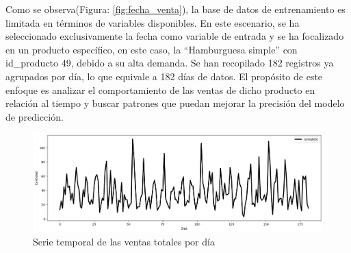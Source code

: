 Como se observa(Figura: \ref{fig:fecha_venta}), la base de datos de entrenamiento es limitada en términos de variables disponibles. En este escenario, se ha seleccionado exclusivamente la fecha como variable de entrada y se ha focalizado en un producto específico, en este caso, la “Hamburguesa simple” con id\_producto 49, debido a su alta demanda. Se han recopilado 182 registros ya agrupados por día, lo que equivale a 182 días de datos. El propósito de este enfoque es analizar el comportamiento de las ventas de dicho producto en relación al tiempo y buscar patrones que puedan mejorar la precisión del modelo de predicción.

\begin{figure}[H]
  \begin{center}
    \includegraphics[scale=0.40]{./serie_normal_completa.png}
    \caption{Serie temporal de las ventas totales por día}
    \label{fig:serie_completa}
  \end{center}
\end{figure}



%   



